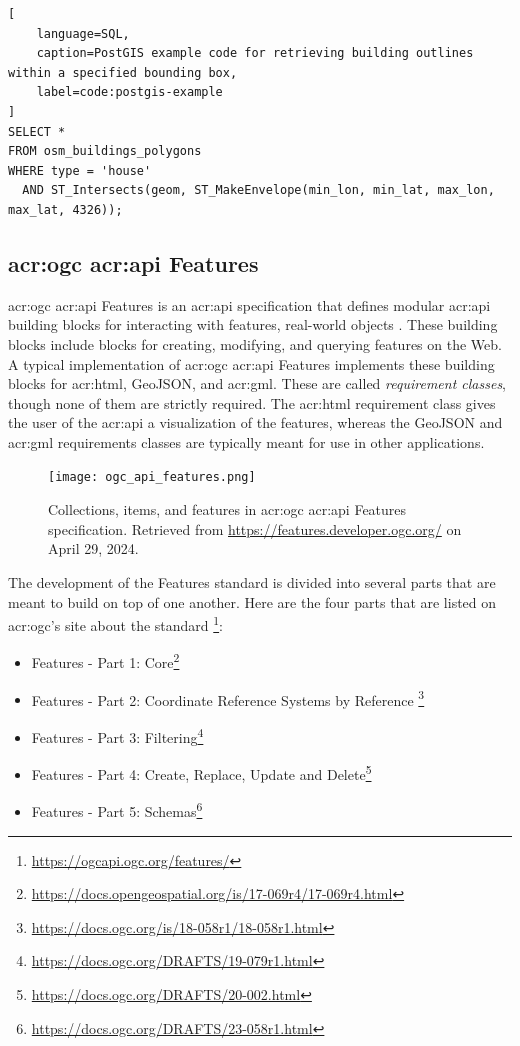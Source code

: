 \begin{lstlisting}[
    language=SQL,
    caption=PostGIS example code for retrieving building outlines within a specified bounding box,
    label=code:postgis-example
]
SELECT * 
FROM osm_buildings_polygons 
WHERE type = 'house' 
  AND ST_Intersects(geom, ST_MakeEnvelope(min_lon, min_lat, max_lon, max_lat, 4326));
\end{lstlisting}

\subsection[OGC API Features]{\acrshort{acr:ogc} \acrshort{acr:api} Features}
\label{subsec:ogc-api-features}

\acrshort{acr:ogc} \acrshort{acr:api} Features is an \acrshort{acr:api} specification that defines modular \acrshort{acr:api} building blocks for interacting with features, real-world objects \citep{opengeospatialconsortiumOGCAPIFeatures2022}. These building blocks include blocks for creating, modifying, and querying features on the Web. A typical implementation of \acrshort{acr:ogc} \acrshort{acr:api} Features implements these building blocks for \acrshort{acr:html}, GeoJSON, and \acrshort{acr:gml}. These are called \textit{requirement classes}, though none of them are strictly required. The \acrshort{acr:html} requirement class gives the user of the \acrshort{acr:api} a visualization of the features, whereas the GeoJSON and \acrshort{acr:gml} requirements classes are typically meant for use in other applications.

\begin{figure}[h]
    \centering
    \texttt{[image: ogc\_api\_features.png]}
    \caption{Collections, items, and features in \acrshort{acr:ogc} \acrshort{acr:api} Features specification. Retrieved from \url{https://features.developer.ogc.org/} on April 29, 2024.}
    \label{fig:oaf-collections-items-features}
\end{figure}

The development of the Features standard is divided into several parts that are meant to build on top of one another. Here are the four parts that are listed on \acrshort{acr:ogc}'s site about the standard \footnote{\url{https://ogcapi.ogc.org/features/}}:

\begin{itemize}
    \item Features - Part 1: Core\footnote{\url{https://docs.opengeospatial.org/is/17-069r4/17-069r4.html}}
    \item Features - Part 2: Coordinate Reference Systems by Reference \footnote{\url{https://docs.ogc.org/is/18-058r1/18-058r1.html}}
    \item Features - Part 3: Filtering\footnote{\url{https://docs.ogc.org/DRAFTS/19-079r1.html}}
    \item Features - Part 4: Create, Replace, Update and Delete\footnote{\url{https://docs.ogc.org/DRAFTS/20-002.html}}
    \item Features - Part 5: Schemas\footnote{\url{https://docs.ogc.org/DRAFTS/23-058r1.html}}
\end{itemize}

